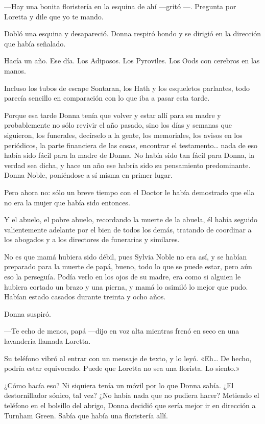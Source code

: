 ---Hay una bonita floristería en la esquina de ahí ---gritó ---.
Pregunta por Loretta y dile que yo te mando.

Dobló una esquina y desapareció. Donna respiró hondo y se dirigió en la
dirección que había señalado.

Hacía un año. Ese día. Los Adiposos. Los Pyroviles. Los Oods con
cerebros en las manos.

Incluso los tubos de escape Sontaran, los Hath y los esqueletos
parlantes, todo parecía sencillo en comparación con lo que iba a pasar
esta tarde.

Porque esa tarde Donna tenía que volver y estar allí para su madre y
probablemente no sólo revivir el año pasado, sino los días y semanas que
siguieron, los funerales, decírselo a la gente, los memoriales, los
avisos en los periódicos, la parte financiera de las cosas, encontrar el
testamento\ldots{} nada de eso había sido fácil para la madre de Donna.
No había sido tan fácil para Donna, la verdad sea dicha, y hace un año
ese habría sido su pensamiento predominante. Donna Noble, poniéndose a
sí misma en primer lugar.

Pero ahora no: sólo un breve tiempo con el Doctor le había demostrado
que ella no era la mujer que había sido entonces.

Y el abuelo, el pobre abuelo, recordando la muerte de la abuela, él
había seguido valientemente adelante por el bien de todos los demás,
tratando de coordinar a los abogados y a los directores de funerarias y
similares.

No es que mamá hubiera sido débil, pues Sylvia Noble no era así, y se
habían preparado para la muerte de papá, bueno, todo lo que se puede
estar, pero aún eso la perseguía. Podía verlo en los ojos de su madre,
era como si alguien le hubiera cortado un brazo y una pierna, y mamá lo
asimiló lo mejor que pudo. Habían estado casados durante treinta y ocho
años.

Donna suspiró.

---Te echo de menos, papá ---dijo en voz alta mientras frenó en seco en
una lavandería llamada Loretta.

Su teléfono vibró al entrar con un mensaje de texto, y lo leyó.
«Eh\ldots{} De hecho, podría estar equivocado. Puede que Loretta no sea
una florista. Lo siento.»

¿Cómo hacía eso? Ni siquiera tenía un móvil por lo que Donna sabía. ¿El
destornillador sónico, tal vez? ¿No había nada que no pudiera hacer?
Metiendo el teléfono en el bolsillo del abrigo, Donna decidió que sería
mejor ir en dirección a Turnham Green. Sabía que había una floristería
allí.

